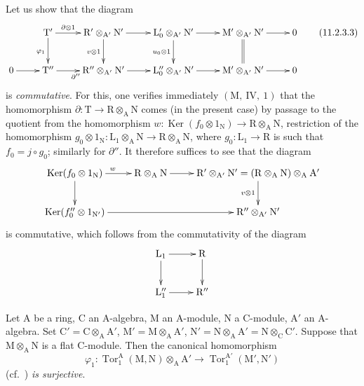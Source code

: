 
Let us show that the diagram
\begin{equation}
\xymatrix{
  & \mathrm{T}' \ar[r]^-{\partial\otimes 1} \ar[d]_{\varphi_1} & \mathrm{R}'\otimes_{\mathrm{A}'}\mathrm{N}' \ar[r] \ar[d]_{v\otimes 1} & \mathrm{L}'_0\otimes_{\mathrm{A}'}\mathrm{N}' \ar[r] \ar[d]_{u_0\otimes 1} & \mathrm{M}'\otimes_{\mathrm{A}'}\mathrm{N}' \ar[r] \ar@{=}[d] & 0 \\
  0 \ar[r] & \mathrm{T}'' \ar[r]_{\partial''} & \mathrm{R}''\otimes_{\mathrm{A}'}\mathrm{N}' \ar[r] & \mathrm{L}''_0\otimes_{\mathrm{A}'}\mathrm{N}' \ar[r] & \mathrm{M}'\otimes_{\mathrm{A}'}\mathrm{N}' \ar[r] & 0
}
  \label{IV.11.2.3.3}
\tag{11.2.3.3}
\end{equation}
is \emph{commutative}. For this, one verifies immediately $(\mathrm{M},~\mathrm{IV},~1)$ that the homomorphism $\partial:\mathrm{T}\to\mathrm{R}\otimes_\mathrm{A}\mathrm{N}$ comes (in the present case) by passage to the quotient from the homomorphism $w:\operatorname{Ker}(f_0\otimes 1_\mathrm{N})\to\mathrm{R}\otimes_\mathrm{A}\mathrm{N}$, restriction of the homomorphism $g_0\otimes 1_\mathrm{N}:\mathrm{L}_1\otimes_\mathrm{A}\mathrm{N}\to\mathrm{R}\otimes_\mathrm{A}\mathrm{N}$, where $g_0:\mathrm{L}_1\to\mathrm{R}$ is such that $f_0=j\circ g_0$; similarly for $\partial''$. It therefore suffices to see that the diagram
\[
\xymatrix{
  \operatorname{Ker}(f_0\otimes 1_\mathrm{N}) \ar[r]^{w} \ar[d] & \mathrm{R}\otimes_\mathrm{A}\mathrm{N} \ar[r] & \mathrm{R}'\otimes_{\mathrm{A}'}\mathrm{N}'=(\mathrm{R}\otimes_\mathrm{A}\mathrm{N})\otimes_\mathrm{A}\mathrm{A}' \ar[d]_{v\otimes 1} \\
  \operatorname{Ker}(f''_0\otimes 1_{\mathrm{N}'}) \ar[rr] & & \mathrm{R}''\otimes_{\mathrm{A}'}\mathrm{N}'
}
\]
is commutative, which follows from the commutativity of the diagram
\[
\xymatrix{
  \mathrm{L}_1 \ar[r] \ar[d] & \mathrm{R} \ar[d] \\
  \mathrm{L}''_1 \ar[r] & \mathrm{R}''
}
\]

\begin{lemma}[11.2.4]
\label{IV.11.2.4}
Let $\mathrm{A}$ be a ring, $\mathrm{C}$ an $\mathrm{A}$-algebra, $\mathrm{M}$ an $\mathrm{A}$-module, $\mathrm{N}$ a $\mathrm{C}$-module, $\mathrm{A}'$ an $\mathrm{A}$-algebra. Set $\mathrm{C}'=\mathrm{C}\otimes_\mathrm{A}\mathrm{A}'$, $\mathrm{M}'=\mathrm{M}\otimes_\mathrm{A}\mathrm{A}'$, $\mathrm{N}'=\mathrm{N}\otimes_\mathrm{A}\mathrm{A}'=\mathrm{N}\otimes_\mathrm{C}\mathrm{C}'$. Suppose that $\mathrm{M}\otimes_\mathrm{A}\mathrm{N}$ is a flat $\mathrm{C}$-module. Then the canonical homomorphism
\[
  \varphi_1:\operatorname{Tor}_1^\mathrm{A}(\mathrm{M},\mathrm{N})\otimes_\mathrm{A}\mathrm{A}'\to\operatorname{Tor}_1^{\mathrm{A}'}(\mathrm{M}',\mathrm{N}')
\]
(cf.\ ) \emph{is surjective}.
\end{lemma}

